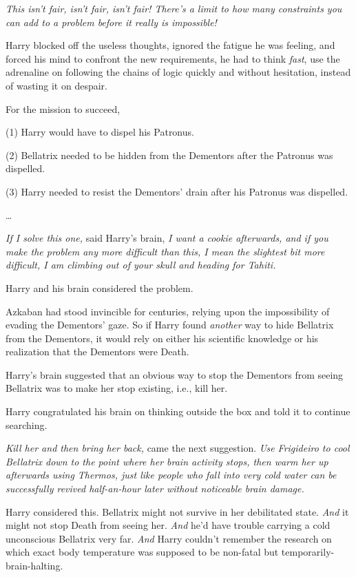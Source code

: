 \emph{This isn't fair, isn't fair, isn't fair! There's a limit to how many constraints you can add to a problem before it really is impossible!}

Harry blocked off the useless thoughts, ignored the fatigue he was feeling, and forced his mind to confront the new requirements, he had to think \emph{fast}, use the adrenaline on following the chains of logic quickly and without hesitation, instead of wasting it on despair.

For the mission to succeed,

(1) Harry would have to dispel his Patronus.

(2) Bellatrix needed to be hidden from the Dementors after the Patronus was dispelled.

(3) Harry needed to resist the Dementors' drain after his Patronus was dispelled.

{\ldots}

\emph{If I solve this one,} said Harry's brain, \emph{I want a cookie afterwards, and if you make the problem any more difficult than this, I mean the slightest bit more difficult, I am climbing out of your skull and heading for Tahiti.}

Harry and his brain considered the problem.

Azkaban had stood invincible for centuries, relying upon the impossibility of evading the Dementors' gaze. So if Harry found \emph{another} way to hide Bellatrix from the Dementors, it would rely on either his scientific knowledge or his realization that the Dementors were Death.

Harry's brain suggested that an obvious way to stop the Dementors from seeing Bellatrix was to make her stop existing, i.e., kill her.

Harry congratulated his brain on thinking outside the box and told it to continue searching.

\emph{Kill her and then bring her back,} came the next suggestion. \emph{Use Frigideiro to cool Bellatrix down to the point where her brain activity stops, then warm her up afterwards using Thermos, just like people who fall into very cold water can be successfully revived half-an-hour later without noticeable brain damage.}

Harry considered this. Bellatrix might not survive in her debilitated state. \emph{And} it might not stop Death from seeing her. \emph{And} he'd have trouble carrying a cold unconscious Bellatrix very far. \emph{And} Harry couldn't remember the research on which exact body temperature was supposed to be non-fatal but temporarily-brain-halting.

